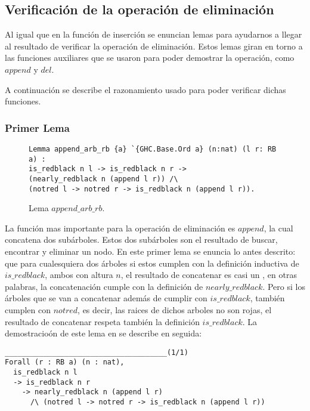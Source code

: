 \subsection{Verificación de la operación de eliminación}
Al igual que en la funci\'on de inserci\'on se enuncian lemas para ayudarnos a llegar al resultado
de verificar la operación de eliminación. Estos lemas giran en torno a las funciones auxiliares
que se usaron para poder demostrar la operación, como $append$ y $del$.

A continuación se describe el razonamiento usado para poder verificar dichas funciones.

\subsubsection{Primer Lema}
\begin{figure}[!ht]
\centering
\captionsetup{justification=centering}
\begin{verbatim}
Lemma append_arb_rb {a} `{GHC.Base.Ord a} (n:nat) (l r: RB a) :
is_redblack n l -> is_redblack n r ->
(nearly_redblack n (append l r)) /\
(notred l -> notred r -> is_redblack n (append l r)).
\end{verbatim}
\caption{Lema $append\_arb\_rb$.}
\label{lema_4}
\end{figure}

La funci\'on mas importante para la operaci\'on de eliminaci\'on es $append$, la cual concatena
dos subárboles. Estos dos subárboles son el resultado de buscar, encontrar y eliminar un nodo. En
este primer lema se enuncia lo antes descrito: que para cualesquiera dos \'arboles si estos
cumplen con la definici\'on inductiva de $is\_redblack$, ambos con altura $n$, el resultado de
concatenar es casi un {\arn}, en otras palabras, la concatenaci\'on cumple con la definición de
$nearly\_redblack$. Pero si los \'arboles que se van a concatenar además de cumplir con
$is\_redblack$, también cumplen con $notred$, es decir, las raices de dichos arboles no son rojas,
el resultado de concatenar respeta también la definici\'on $is\_redblack$. La demostracio\'on de
este lema en {\coq} se describe en seguida:

\begin{verbatim}
______________________________________(1/1)
Forall (r : RB a) (n : nat),
  is_redblack n l
  -> is_redblack n r
    -> nearly_redblack n (append l r)
      /\ (notred l -> notred r -> is_redblack n (append l r))
\end{verbatim}

